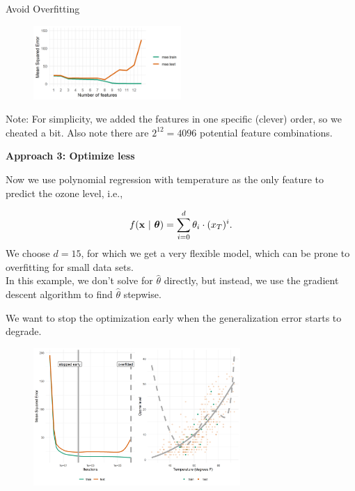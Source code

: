 \documentclass[11pt,compress,t,notes=noshow, xcolor=table]{beamer}
\begin{document}
\begin{vbframe}{Avoid Overfitting}
\begin{figure}
\includegraphics[width=0.5\textwidth]{figure/avoid_overfitting_02.png}\\
\end{figure}


\begin{footnotesize}
Note: For simplicity, we added the features in one specific (clever) order, so we cheated a bit. Also note there are $2^{12} = 4096$ potential feature combinations.
\end{footnotesize}

\framebreak

\textbf{Approach 3: Optimize less}

\lz 

Now we use polynomial regression with temperature as the only feature to predict the ozone level, i.e.,

$$f(\mathbf{x} ~|~ \bm{\theta}) = \sum^{d}_{i=0} \theta_i \cdot (x_T)^{i} .$$
We choose $d = 15$, for which we get a very flexible model, which can be prone to overfitting for small data sets. \\
\medskip
In this example, we don't solve for $\hat\theta$ directly, but instead, we use the gradient descent algorithm to find $\hat\theta$ stepwise.

\framebreak

We want to stop the optimization early when the generalization error starts to degrade.


\begin{figure}
\includegraphics[width=0.7\textwidth]{figure/early_stopping.png}\\
\end{figure}


\end{vbframe}
\end{document}
